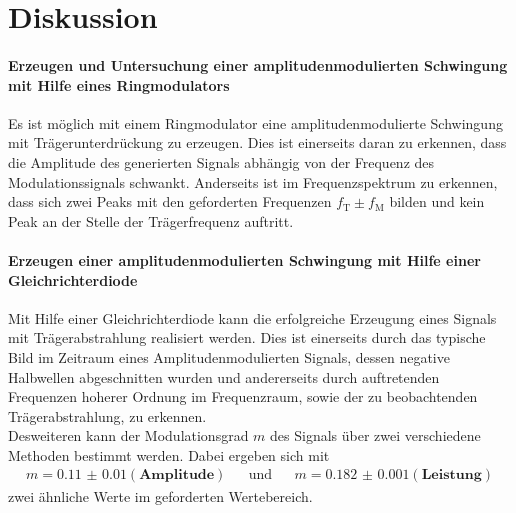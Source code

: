 \FloatBarrier
\section{Diskussion}
\label{sec:Diskussion}

\paragraph{Erzeugen und Untersuchung einer amplitudenmodulierten Schwingung mit
Hilfe eines Ringmodulators}
Es ist möglich mit einem Ringmodulator
eine amplitudenmodulierte Schwingung
mit Trägerunterdrückung zu erzeugen.
Dies ist einerseits daran zu erkennen,
dass die Amplitude des generierten Signals abhängig
von der Frequenz des Modulationssignals schwankt.
%
Anderseits ist im Frequenzspektrum zu erkennen, dass sich zwei
Peaks mit den geforderten Frequenzen $f_{\text{T}}\pm f_{\text{M}}$
bilden
und kein Peak an der Stelle der Trägerfrequenz
auftritt.
\paragraph{Erzeugen einer amplitudenmodulierten Schwingung
mit Hilfe einer Gleichrichterdiode}
Mit Hilfe einer Gleichrichterdiode kann
die erfolgreiche Erzeugung eines Signals mit Trägerabstrahlung
realisiert werden.
Dies ist einerseits durch das typische Bild im Zeitraum eines
Amplitudenmodulierten Signals, dessen negative Halbwellen
abgeschnitten wurden
und andererseits durch auftretenden Frequenzen hoherer
Ordnung
im Frequenzraum, sowie der zu beobachtenden
Trägerabstrahlung, zu erkennen. \\
Desweiteren kann der Modulationsgrad $m$ des Signals
über zwei verschiedene
Methoden bestimmt werden. Dabei ergeben sich mit
\begin{align*}
m=\num{0.11(1)}(\textbf{Amplitude})& &\text{und}& &m=\num{0.182(1)}(\textbf{Leistung})
\end{align*}
zwei ähnliche Werte
im geforderten Wertebereich.

